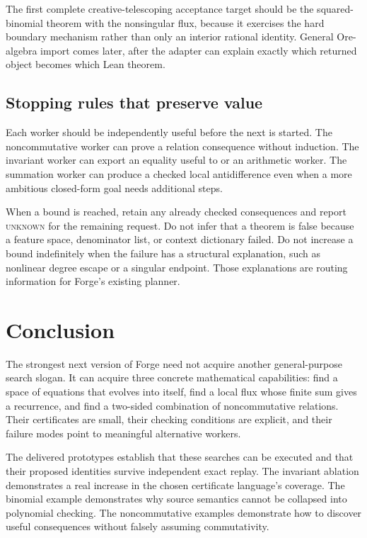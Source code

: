 \documentclass[11pt,letterpaper]{article}
\newcommand{\unknown}{\textsc{unknown}}
\theoremstyle{definition}\newtheorem{definition}[theorem]{Definition}
\theoremstyle{remark}\newtheorem{remark}[theorem]{Remark}
\begin{document}
The first complete creative-telescoping acceptance target should be the
squared-binomial theorem with the nonsingular flux, because it exercises the
hard boundary mechanism rather than only an interior rational identity.
General Ore-algebra import comes later, after the adapter can explain exactly
which returned object becomes which Lean theorem.

\subsection{Stopping rules that preserve value}
Each worker should be independently useful before the next is started. The
noncommutative worker can prove a relation consequence without induction. The
invariant worker can export an equality useful to \grind{} or an arithmetic
worker. The summation worker can produce a checked local antidifference even
when a more ambitious closed-form goal needs additional steps.

When a bound is reached, retain any already checked consequences and report
\unknown{} for the remaining request. Do not infer that a theorem is false
because a feature space, denominator list, or context dictionary failed. Do not
increase a bound indefinitely when the failure has a structural explanation,
such as nonlinear degree escape or a singular endpoint. Those explanations are
routing information for Forge's existing planner.

\section{Conclusion}
The strongest next version of Forge need not acquire another general-purpose
search slogan. It can acquire three concrete mathematical capabilities: find
a space of equations that evolves into itself, find a local flux whose finite
sum gives a recurrence, and find a two-sided combination of noncommutative
relations. Their certificates are small, their checking conditions are explicit,
and their failure modes point to meaningful alternative workers.

The delivered prototypes establish that these searches can be executed and
that their proposed identities survive independent exact replay. The invariant
ablation demonstrates a real increase in the chosen certificate language's
coverage. The binomial example demonstrates why source semantics cannot be
collapsed into polynomial checking. The noncommutative examples demonstrate
how to discover useful consequences without falsely assuming commutativity.
\end{document}
